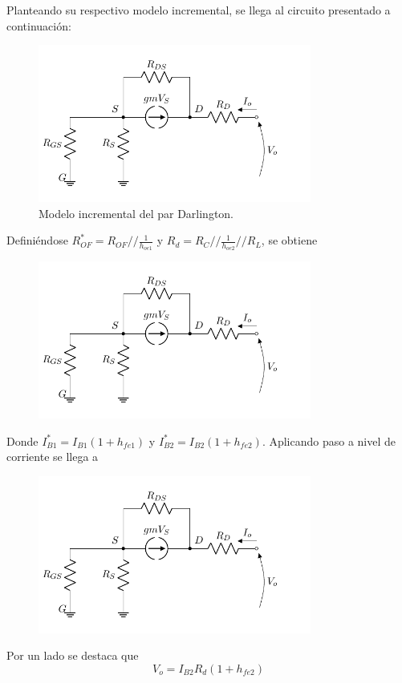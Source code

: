 Planteando su respectivo modelo incremental, se llega al circuito presentado a continuación: 
\begin{figure}[H]
\centering
	\includegraphics[width=0.8\textwidth, page=3]{Imagenes/ModeloIncremental.pdf}
	\caption{Modelo incremental del par Darlington.}
\label{fig:incdar}
\end{figure}

Definiéndose $R_{OF}^* = R_{OF} // \frac{1}{h_{oe1}}$ y $R_d = R_C // \frac{1}{h_{oe2}} // R_L$, se obtiene
\begin{figure}[H]
\centering
	\includegraphics[width=0.8\textwidth, page=4]{Imagenes/ModeloIncremental.pdf}
\end{figure}
Donde $I_{B1}^* = I_{B1} \left( 1 + h_{fe1} \right)$ y $I_{B2}^* = I_{B2} \left( 1 + h_{fe2} \right)$. Aplicando paso a nivel de corriente se llega a
\begin{figure}[H]
\centering
	\includegraphics[width=0.8\textwidth, page=5]{Imagenes/ModeloIncremental.pdf}
\end{figure}
Por un lado se destaca que 
\begin{equation}
	V_o = I_{B2} R_d \left( 1 + h_{fe2} \right)
\label{equ:vo-ib2}
\end{equation}

